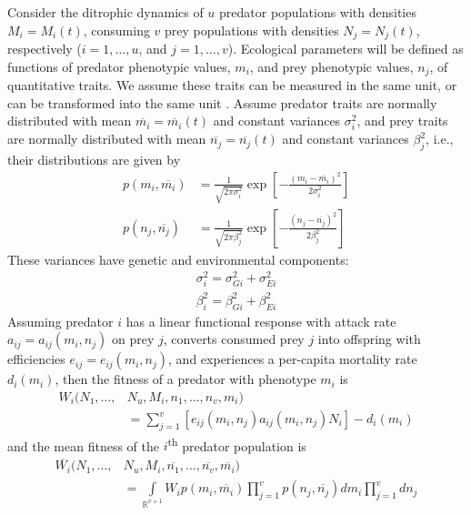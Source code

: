\documentclass{amsart}
\theoremstyle{definition}
\theoremstyle{remark}
\numberwithin{equation}{section}
\begin{document}
Consider the ditrophic dynamics of $u$ predator populations with densities $M_i = M_i(t)$, consuming $v$ prey populations with densities $N_j = N_j(t)$, respectively ($i = 1, \dots, u$, and $j = 1, \dots, v$).  Ecological parameters will be defined as functions of predator phenotypic values, $m_i$, and prey phenotypic values, $n_j$, of quantitative traits.  We assume these traits can be measured in the same unit, or can be transformed into the same unit \cite{Saloniemi_1993}.  Assume predator traits are normally distributed with mean $\overline{m_i} = \overline{m_i}(t)$ and constant variances $\sigma_i^2$, and prey traits are normally distributed with mean $\overline{n_j} = \overline{n_j}(t)$ and constant variances $\beta_j^2$, i.e., their distributions are given by
\begin{equation}
	\label{distributions}
	\begin{aligned}
		p(m_i, \overline{m_i}) &= \frac{1}{\sqrt{2\pi\sigma_i^2}}\exp\left[-\frac{(m_i - \overline{m_i})^2}{2\sigma_i^2}\right] \\
		p(n_j, \overline{n_j}) &= \frac{1}{\sqrt{2\pi\beta_j^2}}\exp\left[-\frac{(n_j - \overline{n_j})^2}{2\beta_j^2}\right]
	\end{aligned}
\end{equation}
These variances have genetic and environmental components:
\begin{equation}
	\label{variances}
	\begin{aligned}
		\sigma_i^2 = \sigma_{Gi}^2 + \sigma_{Ei}^2 \\
		\beta_i^2 = \beta_{Gi}^2 + \beta_{Ei}^2
	\end{aligned}
\end{equation}
Assuming predator $i$ has a linear functional response with attack rate $a_{ij} = a_{ij}(m_i, n_j)$ on prey $j$, converts consumed prey $j$ into offspring with efficiencies $e_{ij} = e_{ij}(m_i, n_j)$, and experiences a per-capita mortality rate $d_i(m_i)$, then the fitness of a predator with phenotype $m_i$ is
\begin{equation}
	\label{predator_fitness}
	\begin{aligned}
		W_i(N_1, \dots, &N_u, M_i, n_1, \dots, n_v, m_i) \\
		&= \sum\limits_{j = 1}^{v}\left[e_{ij}(m_i, n_j)a_{ij}(m_i, n_j)N_i\right] - d_i(m_i)
	\end{aligned}
\end{equation}
and the mean fitness of the $i$\textsuperscript{th} predator population is
\begin{equation}
	\label{avg_predator_fitness}
	\begin{aligned}
		\overline{W_i}(N_1, \dots, &N_u, M_i, \overline{n_1}, \dots, \overline{n_v}, \overline{m_i}) \\
		&= \int\limits_{\mathbb{R}^{v+1}}^{}W_ip(m_i, \overline{m_i})\prod\limits_{j = 1}^{v}p(n_j, \overline{n_j})dm_i\prod\limits_{j = 1}^{v}dn_j
	\end{aligned}
\end{equation}
\end{document}
